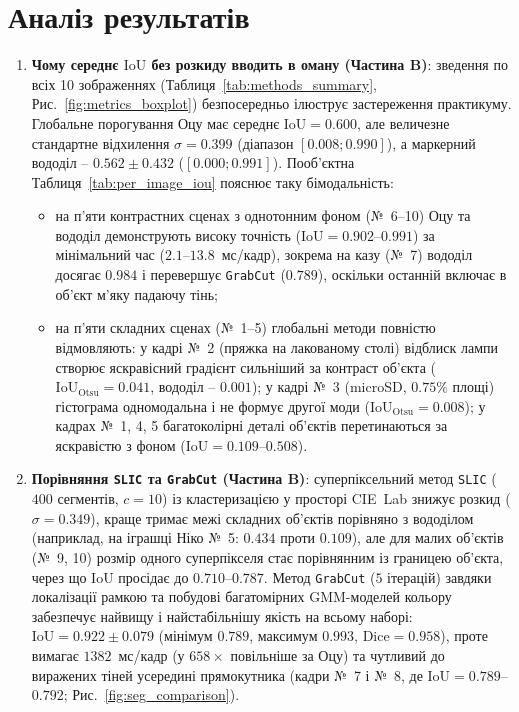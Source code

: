 \documentclass[14pt, a4paper]{extarticle}
\begin{document}
\section{Аналіз результатів}
\begin{enumerate}
    \item \textbf{Чому середнє $\text{IoU}$ без розкиду вводить в оману (Частина B)}: зведення по всіх 10 зображеннях (Таблиця~\ref{tab:methods_summary}, Рис.~\ref{fig:metrics_boxplot}) безпосередньо ілюструє застереження практикуму. Глобальне порогування Оцу має середнє $\text{IoU} = 0.600$, але величезне стандартне відхилення $\sigma = 0.399$ (діапазон $[0.008; 0.990]$), а маркерний вододіл -- $0.562 \pm 0.432$ ($[0.000; 0.991]$). Пооб'єктна Таблиця~\ref{tab:per_image_iou} пояснює таку бімодальність:
    \begin{itemize}
        \item на п'яти контрастних сценах з однотонним фоном (№~6--10) Оцу та вододіл демонструють високу точність ($\text{IoU} = \mathbf{0.902}$--$\mathbf{0.991}$) за мінімальний час ($2.1$--$13.8$~мс/кадр), зокрема на казу (№~7) вододіл досягає $\mathbf{0.984}$ і перевершує \texttt{GrabCut} ($0.789$), оскільки останній включає в об'єкт м'яку падаючу тінь;
        \item на п'яти складних сценах (№~1--5) глобальні методи повністю відмовляють: у кадрі №~2 (пряжка на лакованому столі) відблиск лампи створює яскравісний градієнт сильніший за контраст об'єкта ($\text{IoU}_{\text{Otsu}} = 0.041$, вододіл -- $0.001$); у кадрі №~3 (microSD, $0.75\%$ площі) гістограма одномодальна і не формує другої моди ($\text{IoU}_{\text{Otsu}} = 0.008$); у кадрах №~1, 4, 5 багатоколірні деталі об'єктів перетинаються за яскравістю з фоном ($\text{IoU} = 0.109$--$0.508$).
    \end{itemize}

    \item \textbf{Порівняння \texttt{SLIC} та \texttt{GrabCut} (Частина B)}: суперпіксельний метод \texttt{SLIC} ($400$ сегментів, $c=10$) із кластеризацією у просторі CIE~Lab знижує розкид ($\sigma = 0.349$), краще тримає межі складних об'єктів порівняно з вододілом (наприклад, на іграшці Ніко №~5: $0.434$ проти $0.109$), але для малих об'єктів (№~9, 10) розмір одного суперпікселя стає порівнянним із границею об'єкта, через що $\text{IoU}$ просідає до $0.710$--$0.787$. Метод \texttt{GrabCut} ($5$ ітерацій) завдяки локалізації рамкою та побудові багатомірних GMM-моделей кольору забезпечує найвищу і найстабільнішу якість на всьому наборі: $\text{IoU} = \mathbf{0.922 \pm 0.079}$ (мінімум $0.789$, максимум $0.993$, $\text{Dice} = 0.958$), проте вимагає $1382$~мс/кадр (у $658\times$ повільніше за Оцу) та чутливий до виражених тіней усередині прямокутника (кадри №~7 і №~8, де $\text{IoU} = 0.789$--$0.792$; Рис.~\ref{fig:seg_comparison}).


\end{enumerate}
\end{document}
